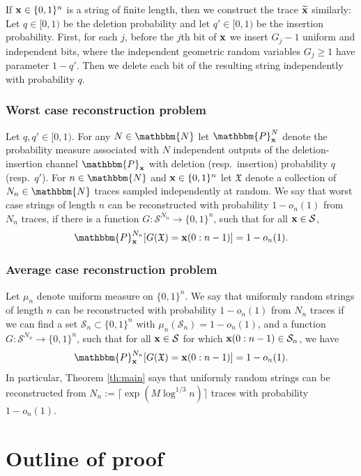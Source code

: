 \documentclass[final,12pt]{colt2018} %
\newcommand{\N}{\mathbbm{N}}
\renewcommand{\P}{\mathbbm{P}}
\newcommand{\1}{\mathbf{1}}
\def\cS{\mathcal{S}}
\def\cS{\mathcal{S}}
\newcommand{\eqbn}{\begin{equation*}}
\newcommand{\eqen}{\end{equation*}}
\newcommand{\frk}{\mathfrak}
\newcommand{\wt}{\widetilde}
\def\x{{\bf x}}
\begin{document}
If $\x\in\{0,1 \}^n$ is a string of finite length, then we construct the trace $\wt\x$ similarly: Let $q\in[0,1)$ be the deletion probability and let $q'\in[0,1)$ be the insertion probability. First, for each $j$, before the $j$th bit of $\x$ we insert $G_j-1$ uniform and independent bits, where the independent geometric random variables $G_j\ge 1 $ have parameter $1-q'$. Then we delete each bit of the resulting string independently with probability $q$.



\subsubsection*{Worst case reconstruction problem}
Let $q,q'\in[0,1)$. For any $N\in\N$ let $\P_{\x}^{N}$ denote the probability measure associated with $N$ independent outputs of the deletion-insertion channel $\P_{\x}$ with deletion (resp.\ insertion) probability $q$ (resp.\ $q'$).  For $n\in\N$
and $\x\in\{0,1 \}^n$ let $\frk X$ denote a
collection of $N_n\in\N$ traces sampled independently at random.
We say that worst case strings of
length $n$ can be reconstructed with probability $1 - o_n(1)$
from $N_n$ traces, if there is a function $G\colon  \cS  ^{N_n} \to \{0,1 \}^n$, such that for all $\x\in\cS$,
\eqbn
\P_{\x}^{N_n}[G(\mathfrak X ) = \x(0:n-1)] = 1-o_n(1).
\eqen

\subsubsection*{Average case reconstruction problem}

Let $\mu_n$ denote uniform measure on $\{0,1 \}^n$.  We say that uniformly random strings of length $n$
can be reconstructed with probability $1-o_n(1)$ from $N_n$ traces
if we can find a set $\cS_n\subset\{0,1 \}^n$ with $\mu_n(\cS_n)=1-o_n(1)$, and a function
$G\colon  \cS^{N_n} \to \{0,1 \}^n$,
such that for all
$\x\in\cS$ for which $\x(0:n-1) \in\cS_n$, we have
\eqbn
\P_{\x}^{N_n}[G(\mathfrak X ) = \x(0:n-1)] = 1-o_n(1).
\eqen
%
In particular, Theorem \ref{th:main} says that uniformly random strings
can be reconstructed from $N_n := \lceil\exp(M\log^{1/3}n)\rceil$ traces with probability $1-o_n(1)$.



\section{Outline of proof} \label{ss:outline}
\end{document}

